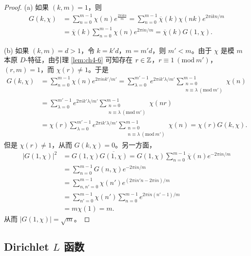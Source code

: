 \begin{proof}
(a) 如果 $(k,m)=1$，则
\begin{align*}
  G(k,\chi)&=\sum_{n=0}^{m-1}\chi(n)e^{\frac{2\pi ikn}{m}}
  =\sum_{n=0}^{m-1}\overline{\chi}(k)\chi(nk)e^{2\pi ikn/m}\\
  &=\overline{\chi}(k)\sum_{n=0}^{m-1}\chi(n)e^{2\pi in/m}
  =\overline{\chi}(k)G(1,\chi).
\end{align*}

(b) 如果 $(k,m)=d>1$，令 $k=k'd$，$m=m'd$，则 $m'<m$。由于 $\chi$ 是模 $m$ 本原 $D$-特征，由引理 \ref{lem:ch4-6} 可知存在 $r\in\mathbb{Z}$，$r\equiv 1\ (\mathrm{mod}\ m')$，$(r,m)=1$，而 $\chi(r)\neq 1$。于是
\begin{align*}
  G(k,\chi)&=\sum_{n=0}^{m-1}\chi(n)e^{2\pi ink'/m'}
  =\sum_{\lambda=0}^{m'-1}e^{2\pi ik'\lambda/m'}\sum_{\substack{n=0\\ n\equiv\lambda\ (\mathrm{mod}\ m')}}^{m-1}\chi(n)\\
  &=\sum_{\lambda=0}^{m'-1}e^{2\pi ik'\lambda/m'}\sum_{\substack{n=0\\ n\equiv\lambda\ (\mathrm{mod}\ m')}}^{m-1}\chi(nr)\\
  &=\chi(r)\sum_{\lambda=0}^{m'-1}e^{2\pi ik'\lambda/m'}\sum_{\substack{n=0\\ n\equiv\lambda\ (\mathrm{mod}\ m')}}^{m-1}\chi(n)=\chi(r)G(k,\chi).
\end{align*}
但是 $\chi(r)\neq 1$，从而 $G(k,\chi)=0$。另一方面，
\begin{align*}
  |G(1,\chi)|^2&=G(1,\chi)\overline{G(1,\chi)}=G(1,\chi)\sum_{n=0}^{m-1}\overline{\chi}(n)e^{-2\pi in/m}\\
  &=\sum_{n=0}^{m-1}G(n,\chi)e^{-2\pi in/m}\\
  &=\sum_{n,n'=0}^{m-1}\chi(n')e^{(2\pi in'n-2\pi in)/m}\\
  &=\sum_{n'=0}^{m-1}\chi(n')\sum_{n=0}^{m-1}e^{2\pi in(n'-1)/m}\\
  &=m\chi(1)=m.
\end{align*}
从而 $|G(1,\chi)|=\sqrt{m}$。
\end{proof}

\subsection{\texorpdfstring{Dirichlet $L$ 函数}{Dirichlet L 函数}}\label{sec:ch4-s2-3}

